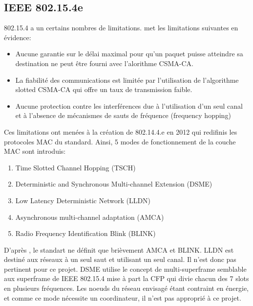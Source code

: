 \subsection*{IEEE 802.15.4e}
    802.15.4 a un certains nombres de limitations. \cite{paper:802.15.4e-survey} met les limitations suivantes en évidence:
    \begin{itemize}
      \item Aucune garantie sur le délai maximal pour qu'un paquet puisse atteindre sa destination
        ne peut être fourni avec l'alorithme CSMA-CA.
      \item La fiabilité des communications est limitée par l'utilisation de l'algorithme slotted   CSMA-CA qui offre un taux de transmission faible.
      \item Aucune protection contre les interférences due à l'utilisation d'un seul canal et à     l'absence de mécanismes de sauts de fréquence (frequency hopping)
    \end{itemize}
    Ces limitations ont menées à la création de 802.14.4.e en 2012 qui redifinis les protocoles MAC du  standard.
    Ainsi, 5 modes de fonctionnement de la couche MAC sont introduis:
    \begin{enumerate}
      \item Time Slotted Channel Hopping (TSCH)
      \item Deterministic and Synchronous Multi-channel Extension (DSME)
      \item Low Latency Deterministic Network (LLDN)
      \item Asynchronous multi-channel adaptation (AMCA)
      \item Radio Frequency Identification Blink (BLINK)
    \end{enumerate}
    D'après \cite{paper:802.15.4e-survey}, le standart ne définit que brièvement AMCA et BLINK.
    LLDN est destiné aux réseaux à un seul saut et utilisant un seul canal. Il n'est donc pas pertinent pour ce projet. DSME utilise le concept de multi-superframe semblable aux superframe de IEEE 802.15.4 mise à part la CFP qui divie chacun des 7 slots en plusieurs fréquences. Les noeuds du réseau envisagé étant contraint en énergie, et comme ce mode nécessite un coordinateur, il n'est pas approprié à ce projet.


